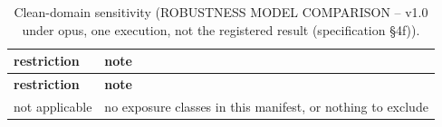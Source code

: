 \begingroup\footnotesize
\begin{longtable}{>{\raggedright\arraybackslash}p{126.4pt}>{\raggedright\arraybackslash}p{304.6pt}}
\caption{Clean-domain sensitivity (ROBUSTNESS MODEL COMPARISON -- v1.0 under opus, one execution, not the registered result (specification §4f)).} \\
\toprule
\textbf{restriction} & \textbf{note} \\
\midrule
\endfirsthead
\toprule
\textbf{restriction} & \textbf{note} \\
\midrule
\endhead
\bottomrule
\endfoot
not applicable & no exposure classes in this manifest, or nothing to exclude \\
\end{longtable}
\endgroup
